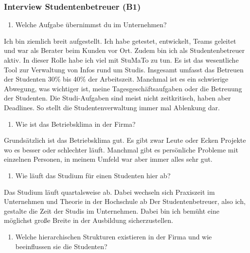 \documentclass[
  12pt,
  ngerman,
  a4paper,
]{article}
\providecommand{\tightlist}{%
  \setlength{\itemsep}{0pt}\setlength{\parskip}{0pt}}
\begin{document}
\hypertarget{interview-studentenbetreuer-b1}{%
\subsubsection{Interview Studentenbetreuer
(B1)}\label{interview-studentenbetreuer-b1}}

\begin{enumerate}
\def\labelenumi{\arabic{enumi}.}
\tightlist
\item
  Welche Aufgabe übernimmst du im Unternehmen?
\end{enumerate}

Ich bin ziemlich breit aufgestellt. Ich habe getestet, entwickelt, Teams
geleitet und war als Berater beim Kunden vor Ort. Zudem bin ich als
Studentenbetreuer aktiv. In dieser Rolle habe ich viel mit StuMaTo zu
tun. Es ist das wesentliche Tool zur Verwaltung von Infos rund um
Studis. Insgesamt umfasst das Betreuen der Studenten 30\% bis 40\% der
Arbeitszeit. Manchmal ist es ein schwierige Abwegung, was wichtiger ist,
meine Tagesgeschäftsaufgaben oder die Betreuung der Studenten. Die
Studi-Aufgaben sind meist nicht zeitkritisch, haben aber Deadlines. So
stellt die Studentenverwaltung immer mal Ablenkung dar.

\begin{enumerate}
\def\labelenumi{\arabic{enumi}.}
\setcounter{enumi}{1}
\tightlist
\item
  Wie ist das Betriebsklima in der Firma?
\end{enumerate}

Grundsätzlich ist das Betriebsklima gut. Es gibt zwar Leute oder Ecken
Projekte wo es besser oder schlechter läuft. Manchmal gibt es
persönliche Probleme mit einzelnen Personen, in meinem Umfeld war aber
immer alles sehr gut.

\begin{enumerate}
\def\labelenumi{\arabic{enumi}.}
\setcounter{enumi}{2}
\tightlist
\item
  Wie läuft das Studium für einen Studenten hier ab?
\end{enumerate}

Das Studium läuft quartalsweise ab. Dabei wechseln sich Praxiszeit im
Unternehmen und Theorie in der Hochschule ab Der Studentenbetreuer, also
ich, gestalte die Zeit der Studis im Unternehmen. Dabei bin ich bemüht
eine möglichst große Breite in der Ausbildung sicherzustellen.

\begin{enumerate}
\def\labelenumi{\arabic{enumi}.}
\setcounter{enumi}{3}
\tightlist
\item
  Welche hierarchischen Strukturen existieren in der Firma und wie
  beeinflussen sie die Studenten?
\end{enumerate}
\end{document}
